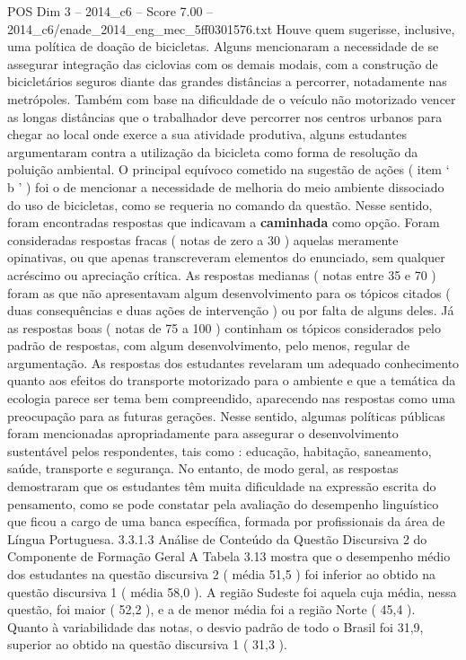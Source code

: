 \begin{textsample}{POS Dim 3 – 2014\_c6 – Score 7.00 – 2014\_c6/enade\_2014\_eng\_mec\_5ff0301576.txt}
Houve quem sugerisse, inclusive, uma política de doação de bicicletas.
Alguns mencionaram a necessidade de se assegurar integração das ciclovias com os demais modais, com a construção de bicicletários seguros diante das grandes distâncias a percorrer, notadamente nas metrópoles.
Também com base na dificuldade de o veículo não motorizado vencer as longas distâncias que o trabalhador deve percorrer nos centros urbanos para chegar ao local onde exerce a sua atividade produtiva, alguns estudantes argumentaram contra a utilização da bicicleta como forma de resolução da poluição ambiental.
O principal equívoco cometido na sugestão de ações ( item ‘ b ’ ) foi o de mencionar a necessidade de melhoria do meio ambiente dissociado do uso de bicicletas, como se requeria no comando da questão.
Nesse sentido, foram encontradas respostas que indicavam a \textbf{caminhada} como opção.
Foram consideradas respostas fracas ( notas de zero a 30 ) aquelas meramente opinativas, ou que apenas transcreveram elementos do enunciado, sem qualquer acréscimo ou apreciação crítica.
As respostas medianas ( notas entre 35 e 70 ) foram as que não apresentavam algum desenvolvimento para os tópicos citados ( duas consequências e duas ações de intervenção ) ou por falta de alguns deles.
Já as respostas boas ( notas de 75 a 100 ) continham os tópicos considerados pelo padrão de respostas, com algum desenvolvimento, pelo menos, regular de argumentação.
As respostas dos estudantes revelaram um adequado conhecimento quanto aos efeitos do transporte motorizado para o ambiente e que a temática da ecologia parece ser tema bem compreendido, aparecendo nas respostas como uma preocupação para as futuras gerações.
Nesse sentido, algumas políticas públicas foram mencionadas apropriadamente para assegurar o desenvolvimento sustentável pelos respondentes, tais como : educação, habitação, saneamento, saúde, transporte e segurança.
No entanto, de modo geral, as respostas demostraram que os estudantes têm muita dificuldade na expressão escrita do pensamento, como se pode constatar pela avaliação do desempenho linguístico que ficou a cargo de uma banca específica, formada por profissionais da área de Língua Portuguesa. 3.3.1.3 Análise de Conteúdo da Questão Discursiva 2 do Componente de Formação Geral A Tabela 3.13 mostra que o desempenho médio dos estudantes na questão discursiva 2 ( média 51,5 ) foi inferior ao obtido na questão discursiva 1 ( média 58,0 ).
A região Sudeste foi aquela cuja média, nessa questão, foi maior ( 52,2 ), e a de menor média foi a região Norte ( 45,4 ).
Quanto à variabilidade das notas, o desvio padrão de todo o Brasil foi 31,9, superior ao obtido na questão discursiva 1 ( 31,3 ).

\end{textsample}
